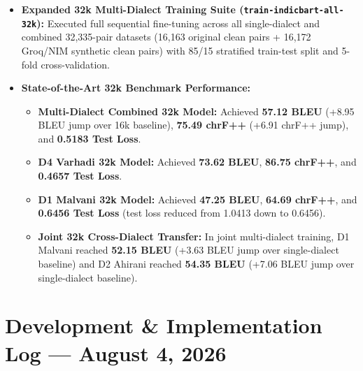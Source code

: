 \documentclass[10pt]{article}
\begin{document}
\begin{itemize}
  \item \textbf{Expanded 32k Multi-Dialect Training Suite (\texttt{train-indicbart-all-32k}):} Executed full sequential fine-tuning across all single-dialect and combined 32,335-pair datasets (16,163 original clean pairs + 16,172 Groq/NIM synthetic clean pairs) with 85/15 stratified train-test split and 5-fold cross-validation.
  \item \textbf{State-of-the-Art 32k Benchmark Performance:}
    \begin{itemize}
      \item \textbf{Multi-Dialect Combined 32k Model:} Achieved \textbf{57.12 BLEU} (+8.95 BLEU jump over 16k baseline), \textbf{75.49 chrF++} (+6.91 chrF++ jump), and \textbf{0.5183 Test Loss}.
      \item \textbf{D4 Varhadi 32k Model:} Achieved \textbf{73.62 BLEU}, \textbf{86.75 chrF++}, and \textbf{0.4657 Test Loss}.
      \item \textbf{D1 Malvani 32k Model:} Achieved \textbf{47.25 BLEU}, \textbf{64.69 chrF++}, and \textbf{0.6456 Test Loss} (test loss reduced from 1.0413 down to 0.6456).
      \item \textbf{Joint 32k Cross-Dialect Transfer:} In joint multi-dialect training, D1 Malvani reached \textbf{52.15 BLEU} (+3.63 BLEU jump over single-dialect baseline) and D2 Ahirani reached \textbf{54.35 BLEU} (+7.06 BLEU jump over single-dialect baseline).
    \end{itemize}
\end{itemize}

\section*{Development \& Implementation Log --- August 4, 2026}
\end{document}
